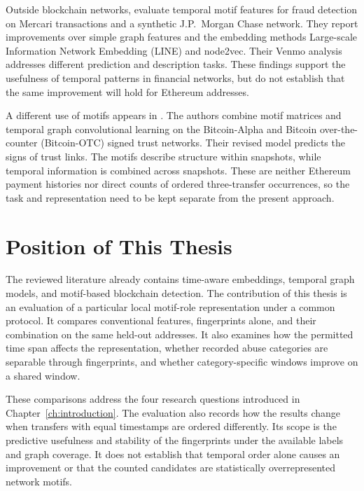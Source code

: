 Outside blockchain networks, \citet{liu2023temporal} evaluate temporal motif
features for fraud detection on Mercari transactions and a synthetic
J.P.\ Morgan Chase network. They report improvements over simple graph
features and the embedding methods Large-scale Information Network Embedding
(LINE) and node2vec. Their Venmo analysis addresses different prediction and
description tasks. These findings support the usefulness of temporal patterns
in financial networks, but do not establish that the same improvement will
hold for Ethereum addresses.

A different use of motifs appears in \citet{mo2022motifgcn}.
The authors combine motif matrices and temporal graph convolutional learning
on the Bitcoin-Alpha and Bitcoin over-the-counter (Bitcoin-OTC) signed trust
networks. Their revised model predicts the signs of trust links. The motifs
describe structure within snapshots, while temporal information is combined
across snapshots. These are neither Ethereum payment histories nor direct
counts of ordered three-transfer occurrences, so the task and representation
need to be kept separate from the present approach.

\section{Position of This Thesis}
\label{sec:related_position}

The reviewed literature already contains time-aware embeddings, temporal graph
models, and motif-based blockchain detection. The contribution of this thesis
is an evaluation of a particular local motif-role representation under a common
protocol. It compares conventional features, fingerprints alone, and their
combination on the same held-out addresses. It also examines how the permitted
time span affects the representation, whether recorded abuse categories are
separable through fingerprints, and whether category-specific windows improve
on a shared window.

These comparisons address the four research questions introduced in
Chapter~\ref{ch:introduction}. The evaluation also records how the results
change when transfers with equal timestamps are ordered differently. Its scope
is the predictive usefulness and stability of the fingerprints under the
available labels and graph coverage. It does not establish that temporal order
alone causes an improvement or that the counted candidates are statistically
overrepresented network motifs.
